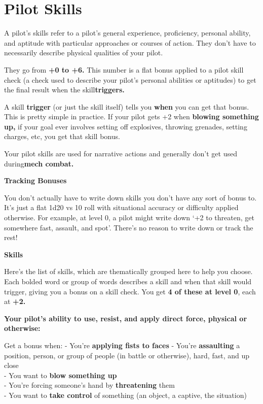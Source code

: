 \section{Pilot Skills}

A pilot’s skills refer to a pilot’s general experience, proficiency, personal ability, and aptitude with
particular approaches or courses of action. They don’t have to necessarily describe physical
qualities of your pilot.

They go from \textbf{+0 to +6.} This number is a flat bonus applied to a pilot skill check (a check used to
describe your pilot’s personal abilities or aptitudes) to get the final result when the skill\textbf{triggers.} 

A skill \textbf{trigger} (or just the skill itself) tells you \textbf{when} you can get that bonus. This is pretty simple in
practice. If your pilot gets +2 when \textbf{blowing something up,} if your goal ever involves setting off
explosives, throwing grenades, setting charges, etc, you get that skill bonus.

Your pilot skills are used for narrative actions and generally don’t get used during\textbf{mech combat.} 

                                               \textbf{Tracking Bonuses} 


You don’t actually have to write down skills you don’t have any sort of bonus to. It’s just a flat
1d20 vs 10 roll with situational accuracy or difficulty applied otherwise. For example, at level 0, a
pilot might write down ‘+2 to threaten, get somewhere fast, assault, and spot’. There’s no reason
to write down or track the rest!


                                                       \textbf{Skills} 

Here’s the list of skills, which are thematically grouped here to help you choose. Each bolded
word or group of words describes a skill and when that skill would trigger, giving you a bonus on a
skill check. You get \textbf{4 of these at level 0}, each at \textbf{+2.} 

\textbf{Your pilot’s ability to use, resist, and apply direct force, physical or otherwise:}

Get a bonus when: - You’re \textbf{applying fists to faces}
    - You’re \textbf{assaulting} a position, person, or group of people (in battle
or otherwise), hard, fast, and up close\\
    - You want to \textbf{blow something up}\\
    - You’re forcing someone’s hand by \textbf{threatening} them\\
    - You want to \textbf{take control} of something (an object, a captive, the
situation)\\


